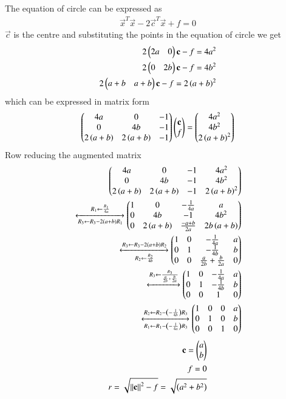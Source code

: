 The equation of circle can be expressed as
\begin{align}
    \vec{x}^T\vec{x}-2\vec{c}^T\vec{x}+f = 0
\end{align}
$\vec{c}$ is the centre  and substituting the points in the equation of circle we get
\begin{align}
2\begin{pmatrix}2a&0\end{pmatrix}\mathbf{c}-f=4a^2\\
2\begin{pmatrix}0&2b\end{pmatrix}\mathbf{c}-f=4b^2\\
2\begin{pmatrix}a+b&a+b\end{pmatrix}\mathbf{c}-f=2\left(a+b\right)^2
\end{align}
which can be expressed in matrix form
\begin{align}
\begin{pmatrix}4a&0&-1\\0&4b&-1\\2\left(a+b\right)&2\left(a+b\right)&-1\end{pmatrix}\begin{pmatrix}\mathbf{c}\\f\end{pmatrix} = \begin{pmatrix}4a^2\\4b^2\\2\left(a+b\right)^2\end{pmatrix}
\end{align}
Row reducing the augmented matrix
\begin{align}
\begin{pmatrix}4a&0&-1&4a^2\\0&4b&-1&4b^2\\2\left(a+b\right)&2\left(a+b\right)&-1&2\left(a+b\right)^2\end{pmatrix}\\
\xleftrightarrow[R_3\leftarrow R_3-2\left(a+b\right)R_1]{R_1\leftarrow \frac{R_1}{4 a}}
\begin{pmatrix}1 & 0 & - \frac{1}{4 a} & a \\ 0 & 4 b & -1 & 4 b^{2} \\ 0 & 2 \left(a + b\right)& \frac{-a + b}{2 a} & 2b\left(a + b\right)\end{pmatrix}\\
\xleftrightarrow[R_2\leftarrow \frac{R_2}{4 b}]{R_3\leftarrow R_3-2\ensuremath{\left(a + b\right)}R_2}
\begin{pmatrix}1 & 0 & - \frac{1}{4 a} & a \\ 0 & 1 & - \frac{1}{4 b} & b \\ 0 & 0 & \frac{a}{2 b} + \frac{b}{2 a} & 0\end{pmatrix}\\
\xleftrightarrow[]{R_3\leftarrow \frac{R_3}{\frac{a}{2b} + \frac{b}{2a}}}
\begin{pmatrix}1 & 0 & - \frac{1}{4 a} & a \\ 0 & 1 & - \frac{1}{4 b} & b \\ 0 & 0 & 1 & 0\end{pmatrix}\\
\xleftrightarrow[R_1\leftarrow R_1-\left(-\frac{1}{4 a}\right)R_3]{R_2\leftarrow R_2-\ensuremath{\left(-\frac{1}{4 b}\right)}R_3}
\begin{pmatrix}1 & 0 & 0 & a \\ 0 & 1 & 0 & b \\ 0 & 0 & 1 & 0\end{pmatrix}
\end{align}
\begin{align}
    \mathbf{c} = \begin{pmatrix}a\\b\end{pmatrix}\\
    f = 0\\
    r=\sqrt{\left\lVert\mathbf{c}\right\rVert^2-f} = \sqrt{\left(a^2+b^2\right)}
\end{align}
